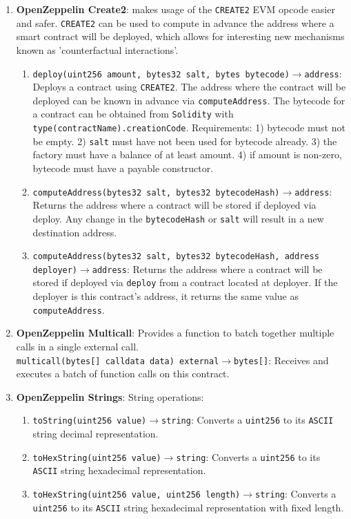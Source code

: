 \begin{enumerate}
\item\textbf{OpenZeppelin Create2}: makes usage of the \verb|CREATE2| EVM opcode easier and safer. \verb|CREATE2| can be used to compute in advance the address where a smart contract will be deployed, which allows for interesting new mechanisms known as 'counterfactual interactions’.
	\begin{enumerate}
	\item\verb|deploy(uint256 amount, bytes32 salt, bytes bytecode)|$\rightarrow$\verb|address|: Deploys a contract using \verb|CREATE2|. The address where the contract will be deployed can be known in advance via \verb|computeAddress|. The bytecode for a contract can be obtained from \verb|Solidity| with \verb|type(contractName).creationCode|. Requirements: 1) bytecode must not be empty. 2) \verb|salt| must have not been used for bytecode already. 3) the factory must have a balance of at least amount. 4) if amount is non-zero, bytecode must have a payable constructor.
	\item\verb|computeAddress(bytes32 salt, bytes32 bytecodeHash)|$\rightarrow$\verb|address|: Returns the address where a contract will be stored if deployed via deploy. Any change in the \verb|bytecodeHash| or \verb|salt| will result in a new destination address.
	\item\verb|computeAddress(bytes32 salt, bytes32 bytecodeHash, address deployer)|$\rightarrow$\verb|address|: Returns the address where a contract will be stored if deployed via \verb|deploy| from a contract located at deployer. If the deployer is this contract’s address, it returns the same value as \verb|computeAddress|.
	\end{enumerate}

\item\textbf{OpenZeppelin Multicall}: Provides a function to batch together multiple calls in a single external call.\\\verb|multicall(bytes[] calldata data) external|$\rightarrow$\verb|bytes[]|: Receives and executes a batch of function calls on this contract.

\item\textbf{OpenZeppelin Strings}: String operations:
	\begin{enumerate}
	\item\verb|toString(uint256 value)|$\rightarrow$\verb|string|: Converts a \verb|uint256| to its \verb|ASCII| string decimal representation.
	\item\verb|toHexString(uint256 value)|$\rightarrow$\verb|string|: Converts a \verb|uint256| to its \verb|ASCII| string hexadecimal representation.
	\item\verb|toHexString(uint256 value, uint256 length)|$\rightarrow$\verb|string|: Converts a \verb|uint256| to its \verb|ASCII| string hexadecimal representation with fixed length.
	\end{enumerate}


\end{enumerate}
